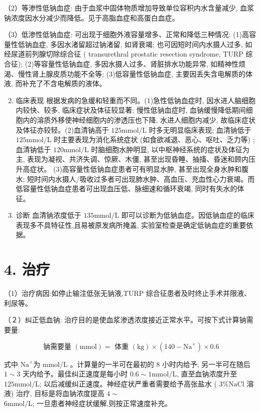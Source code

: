 \documentclass[10pt]{article}
\begin{document}
（2）等渗性低钠血症: 由于血浆中固体物质增加导致单位容积内水含量减少, 血浆钠浓度因水分减少而降低。见于高脂血症和高蛋白血症。

（3）低渗性低钠血症: 可出现于细胞外液容量增多、正常和降低三种情况: (1)高容量性低钠血症, 多因水渚留超过钠渚留, 如肾衰竭; 也可因短时间内水摄人过多, 如经尿道前列腺切除综合征 ( transurethral prostatic resection syndrome, TURP 综合征); (2)等容量性低钠血症, 多因水摄人过多、肾脏排水功能异常, 如精神性烦渴、慢性肾上腺皮质功能不全等; (3)低容量性低钠血症, 主要因丢失含电解质的体液, 而补充了不含电解质的液体。

\begin{enumerate}
  \setcounter{enumi}{1}
  \item 临床表现 根据发病的急缓和轻重而不同。(1)急性低钠血症时, 因水进人脑细胞内较快、较多, 临床症状及体征较显著; 慢性低钠血症时, 血钠缓慢降低期间细胞内的溶质外移使神经细胞内的渗透压也下降, 水进人细胞内减少, 故临床症状及体征亦较轻。(2)血清钠高于 $125 \mathrm{mmol} / \mathrm{L}$ 时多无明显临床表现; 血清钠低于 $125 \mathrm{mmol} / \mathrm{L}$ 时主要表现为消化系统症状 (如食欲减退、恶心、呕吐、乏力等) ; 血清钠低于 $120 \mathrm{mmol} / \mathrm{L}$ 时脑细胞水肿明显, 以中枢神经系统的症状及体征为主, 表现为凝视、共济失调、惊厥、木僵, 甚至出现昏睡、抽搐、昏迷和顾内压升高症状。 (3)高容量性低钠血症患者可有明显水肿, 甚至出现全身水肿和腹水; 短时间内水摄人/吸收过多者可出现肺水肿、高血压、充血性心力衰竭。而低容量性低钠血症患者可出现血压低、脉细速和循环衰竭, 同时有失水的体征。

  \item 诊断 血清钠浓度低于 $135 \mathrm{mmol} / \mathrm{L}$ 即可以诊断为低钠血症。因低钠血症的临床表现多不具特征性,且易被原发病所掩盖, 实验室检查是确定低钠血症的重要依据。

\end{enumerate}

\section*{4. 治疗}
（1）治疗病因:如停止输注低张无钠液,TURP 综合征患者及时终止手术并限液、利尿等。

（２）纠正低血钠: 治疗目的是使血浆渗透浓度接近正常水平。可按下式计算钠需要量:

\[
\text { 钠需要量 }(\mathrm{mmol})=\text { 体重 }(\mathrm{kg}) \times\left(140-\mathrm{Na}^{+}\right) \times 0.6
\]

式中 $\mathrm{Na}^{+}$为 $\mathrm{mmol} / \mathrm{L}$ 。计算量的一半可在最初的 8 小时内给予; 另一半可在随后 $1 \sim 3$ 天内给予。最佳纠正速度是每小时 $0.6 \sim 1 \mathrm{mmol} / \mathrm{L}$, 直至血钠浓度升至 $125 \mathrm{mmol} / \mathrm{L}$; 以后减缓纠正速度。神经症状严重者需要给予高张盐水 ( $3 \% \mathrm{NaCl}$ 溶液) 治疗, 目标是将血钠浓度提高 $4 \sim$\\
$6 \mathrm{mmol} / \mathrm{L}$; 一旦患者神经症状缓解,则按正常速度补充。
\end{document}
